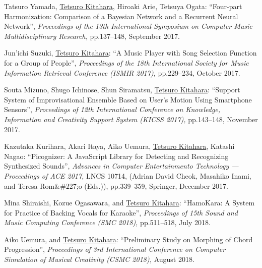 \begin{Enumerate}
\item 
Tatsuro Yamada, 
\underline{Tetsuro Kitahara}, 
Hiroaki Arie, 
Tetsuya Ogata: 
    ``Four-part Harmonization: Comparison of a Bayesian Network and a Recurrent Neural Network'', 
    {\it Proceedings of the 13th International Symposium on Computer Music Multidisciplinary Research,
    } pp.137--148, September 2017. 

\item 
Jun'ichi Suzuki, 
\underline{Tetsuro Kitahara}: 
    ``A Music Player with Song Selection Function for a Group of People'', 
    {\it Proceedings of the 18th International Society for Music Information Retrieval Conference (ISMIR 2017),
    } pp.229--234, October 2017. 

\item 
Souta Mizuno, 
Shugo Ichinose, 
Shun Siramatsu, 
\underline{Tetsuro Kitahara}: 
    ``Support System of Improvisational Ensemble Based on User’s Motion Using Smartphone Sensors'', 
    {\it Proceedings of 12th International Conference on Knowledge, Information and Creativity Support System (KICSS 2017),
    } pp.143--148, November 2017. 

\item 
Kazutaka Kurihara, 
Akari Itaya, 
Aiko Uemura, 
\underline{Tetsuro Kitahara}, 
Katashi Nagao: 
    ``Picognizer: A JavaScript Library for Detecting and Recognizing Synthesized Sounds'', 
    {\it Advances in Computer Entertainmento Technology --- Proceedings of ACE 2017,
    } LNCS 10714, (Adrian David Cheok, Masahiko Inami, and Teresa Rom\&\#227;o (Eds.)), pp.339--359, Springer, December 2017. 

\item 
Mina Shiraishi, 
Kozue Ogasawara, 
and 
\underline{Tetsuro Kitahara}: 
    ``HamoKara: A System for Practice of Backing Vocals for Karaoke'', 
    {\it Proceedings of 15th Sound and Music Computing Conference (SMC 2018),
    } pp.511--518, July 2018. 

\item 
Aiko Uemura, 
and 
\underline{Tetsuro Kitahara}: 
    ``Preliminary Study on Morphing of Chord
Progression'', 
    {\it 
Proceedings of 3rd International Conference on Computer Simulation of Musical Creativity (CSMC 2018),
    } August 2018. 


\end{Enumerate}
